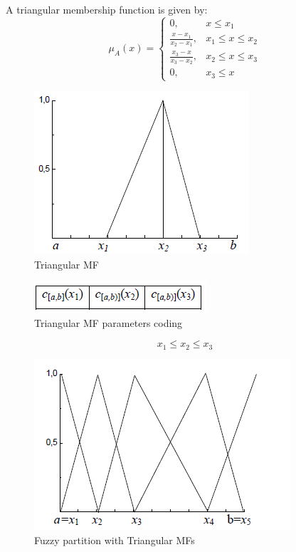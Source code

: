 \documentclass[runningheads,a4paper]{llncs}
\begin{document}
A triangular membership function is given by:
\begin{equation} 
\mu_{A}(x)= \left \{
\begin{array}{ll}
0, & x \leq x_{1}\\
\frac{x - x_{1}}{x_{2} - x_{1}}, &x_{1} \leq x \leq x_{2}  \\
\frac{x_{3} - x}{x_{3} - x_{2}}, &x_{2} \leq x \leq x_{3}  \\
0,& x_{3} \leq x 
\end{array}
\right.
\end{equation}

\begin{figure}[!ht]
	\begin{center}
		\includegraphics[scale=0.90]{fig/triangulaire}
		\caption {Triangular MF}
		\label{tri}
	\end{center}
\end{figure}


\begin{figure}[!ht]
	\begin{center}
		\includegraphics[scale=0.95]{fig/codage}
		\caption {Triangular MF parameters coding}
		\label{co} 
	\end{center}
\end{figure}

\begin{equation}\label{key}
x_{1} \leq x_{2} \leq x_{3}
\end{equation}

\begin{figure}[!ht]
	\begin{center}
		\includegraphics[scale=0.95]{fig/vl}
		\caption {Fuzzy partition with Triangular MFs}
		\label{vl} 
	\end{center}
\end{figure}
\end{document}

